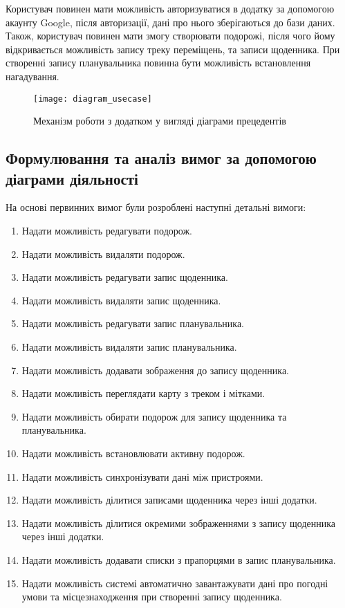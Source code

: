 \documentclass[../main.tex]{subfiles}
\begin{document}
Користувач повинен мати можливість авторизуватися в додатку за допомогою акаунту Google, після авторизації, дані про нього зберігаються до бази даних. Також, користувач повинен мати змогу створювати подорожі, після чого йому відкривається можливість запису треку переміщень, та записи щоденника. При створенні запису планувальника повинна бути можливість встановлення нагадування.

\begin{figure}[H]
	\centering
	\texttt{[image: diagram\_usecase]}
	\caption{Механізм роботи з додатком у вигляді діаграми прецедентів}
	\label{diagram:usecase}
\end{figure}

\subsection{Формулювання та аналіз вимог за допомогою діаграми діяльності}
На основі первинних вимог були розроблені наступні детальні вимоги:
\begin{enumerate}
	\item Надати можливість редагувати подорож.
	\item Надати можливість видаляти подорож.
	\item Надати можливість редагувати запис щоденника.
	\item Надати можливість видаляти запис щоденника.
	\item Надати можливість редагувати запис планувальника.
	\item Надати можливість видаляти запис планувальника.
	\item Надати можливість додавати зображення до запису щоденника.
	\item Надати можливість переглядати карту з треком і мітками.
	\item Надати можливість обирати подорож для запису щоденника та планувальника.
	\item Надати можливість встановлювати активну подорож.
	\item Надати можливість синхронізувати дані між пристроями.
	\item Надати можливість ділитися записами щоденника через інші додатки.
	\item Надати можливість ділитися окремими зображеннями з запису щоденника через інші додатки.
	\item Надати можливість додавати списки з прапорцями в запис планувальника.
	\item Надати можливість системі автоматично завантажувати дані про погодні умови та місцезнаходження при створенні запису щоденника.
\end{enumerate}
\end{document}
